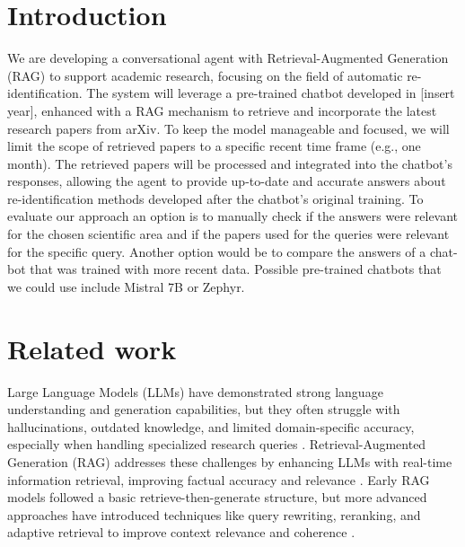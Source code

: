 \documentclass[fleqn,moreauthors,10pt]{ds_report}
\affiliation{\textit{Advisors: Aleš Žagar}}
\begin{document}
\flushbottom 

\maketitle 

\thispagestyle{empty} 


\section*{Introduction}
We are developing a conversational agent with Retrieval-Augmented Generation (RAG) to support academic research, focusing on the field of automatic re-identification. The system will leverage a pre-trained chatbot developed in [insert year], enhanced with a RAG mechanism to retrieve and incorporate the latest research papers from arXiv. To keep the model manageable and focused, we will limit the scope of retrieved papers to a specific recent time frame (e.g., one month). The retrieved papers will be processed and integrated into the chatbot's responses, allowing the agent to provide up-to-date and accurate answers about re-identification methods developed after the chatbot’s original training. To evaluate our approach an option is to manually check if the answers were relevant for the chosen scientific area and if the papers used for the queries were relevant for the specific query. Another option would be to compare the answers of a chat-bot that was trained with more recent data. Possible pre-trained chatbots that we could use include Mistral 7B or Zephyr. 






\section*{Related work}


Large Language Models (LLMs) have demonstrated strong language understanding and generation capabilities, but they often struggle with hallucinations, outdated knowledge, and limited domain-specific accuracy, especially when handling specialized research queries \cite{kandpal2023longtail}. Retrieval-Augmented Generation (RAG) addresses these challenges by enhancing LLMs with real-time information retrieval, improving factual accuracy and relevance \cite{gao2024rag}. Early RAG models followed a basic retrieve-then-generate structure, but more advanced approaches have introduced techniques like query rewriting, reranking, and adaptive retrieval to improve context relevance and coherence \cite{gao2024rag}.
\end{document}
